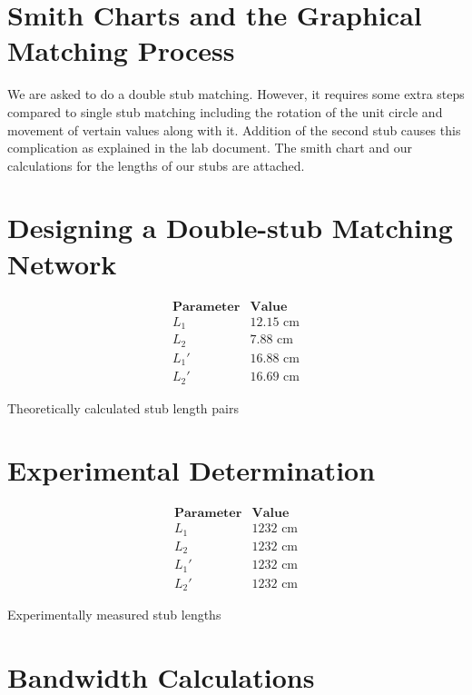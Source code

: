 \documentclass[10pt]{article}
\begin{document}
\section{Smith Charts and the Graphical Matching Process}

We are asked to do a double stub matching. However, it requires some extra steps compared to single stub matching
including the rotation of the unit circle and movement of vertain values along with it. Addition of the second stub
causes this complication as explained in the lab document. The smith chart and our calculations for the lengths of 
our stubs are attached.

\section{Designing a Double-stub Matching Network}
\begin{table}
  \[
      \begin{array}{c|c}
          \textbf{Parameter} & \textbf{Value} \\ \hline
          L_1 & 12.15 \text{ cm}\\
          L_2 & 7.88 \text{ cm}\\
          L_1' & 16.88 \text{ cm}\\
          L_2' & 16.69 \text{ cm}
      \end{array}
  \]
  \caption{Theoretically calculated stub length pairs}
\end{table}

\section{Experimental Determination }
\begin{table}
  \[
      \begin{array}{c|c}
          \textbf{Parameter} & \textbf{Value} \\ \hline
          L_1 & 1232 \text{ cm}\\
          L_2 & 1232 \text{ cm}\\
          L_1' & 1232 \text{ cm}\\
          L_2' & 1232 \text{ cm}
      \end{array}
  \]
  \caption{Experimentally measured stub lengths}
\end{table}
\section{Bandwidth Calculations}
\end{document}
